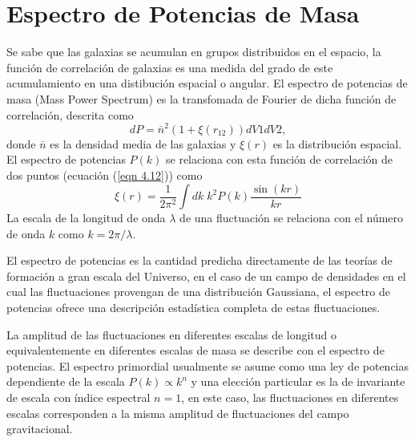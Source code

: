 \documentclass[a4paper,openright,10pt, oneside, final]{book}
\begin{document}


\section{Espectro de Potencias de Masa}
Se sabe que las galaxias se acumulan en grupos distribuidos en el espacio, la función de correlación de galaxias es una medida del grado de este acumulamiento en una distibución espacial o angular. El espectro de potencias de masa (Mass Power Spectrum) es la transfomada de Fourier de dicha función de correlación, descrita como
\begin{equation}
dP = \bar{n}^{2}(1+\xi(r_{12}))dV1dV2,\label{eqn 4.12}
\end{equation}
donde $\bar{n}$ es la densidad media de las galaxias y $\xi(r)$ es la distribución espacial. El espectro de potencias $P(k)$ se relaciona con esta función de correlación de dos puntos (ecuación (\ref{eqn 4.12})) como
\begin{equation}
\xi(r) = \frac{1}{2\pi^{2}}\int dk \;k^{2} P(k)\frac{\sin(kr)}{kr}\label{eqn 4.13}
\end{equation}
La escala de la longitud de onda $\lambda$ de una fluctuación se relaciona con el número de onda $k$ como $k = 2\pi/\lambda$.

El espectro de potencias es la cantidad predicha directamente de las teorías de formación a gran escala del Universo, en el caso de un campo de densidades en el cual las fluctuaciones provengan de una distribución Gaussiana, el espectro de potencias ofrece una descripción estadística completa de estas fluctuaciones. 

La amplitud de las fluctuaciones en diferentes escalas de longitud o equivalentemente en diferentes escalas de masa se describe con el espectro de potencias. El espectro primordial usualmente se asume como una ley de potencias dependiente de la escala $P(k) \propto k^{n}$ y una elección particular es la de invariante de escala con índice espectral $n=1$, en este caso, las fluctuaciones en diferentes escalas corresponden a la misma amplitud de fluctuaciones del campo gravitacional.
\end{document}
